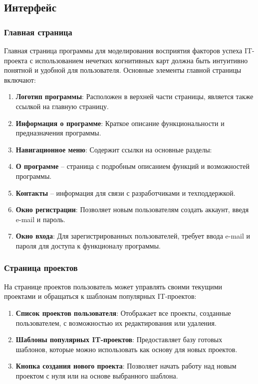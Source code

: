 \documentclass{article}
\begin{document}
    \subsection{Интерфейс}

    \subsubsection{Главная страница}
    Главная страница программы для моделирования восприятия факторов успеха IT-проекта с использованием нечетких когнитивных карт должна быть интуитивно понятной и удобной для пользователя. Основные элементы главной страницы включают:
    \begin{enumerate}
        \item \textbf{Логотип программы}: Расположен в верхней части страницы, является также ссылкой на главную страницу.
        \item \textbf{Информация о программе}: Краткое описание функциональности и предназначения программы.
        \item \textbf{Навигационное меню}: Содержит ссылки на основные разделы:
        \item \textbf{О программе} – страница с подробным описанием функций и возможностей программы.
        \item \textbf{Контакты} – информация для связи с разработчиками и техподдержкой.
        \item \textbf{Окно регистрации}: Позволяет новым пользователям создать аккаунт, введя e-mail и пароль.
        \item \textbf{Окно входа}: Для зарегистрированных пользователей, требует ввода e-mail и пароля для доступа к функционалу программы.
    \end{enumerate}

    \subsubsection{Страница проектов}
    На странице проектов пользователь может управлять своими текущими проектами и обращаться к шаблонам популярных IT-проектов:
    \begin{enumerate}
        \item \textbf{Список проектов пользователя}: Отображает все проекты, созданные пользователем, с возможностью их редактирования или удаления.
        \item \textbf{Шаблоны популярных IT-проектов}: Предоставляет базу готовых шаблонов, которые можно использовать как основу для новых проектов.
        \item \textbf{Кнопка создания нового проекта}: Позволяет начать работу над новым проектом с нуля или на основе выбранного шаблона.
    \end{enumerate}
\end{document}
